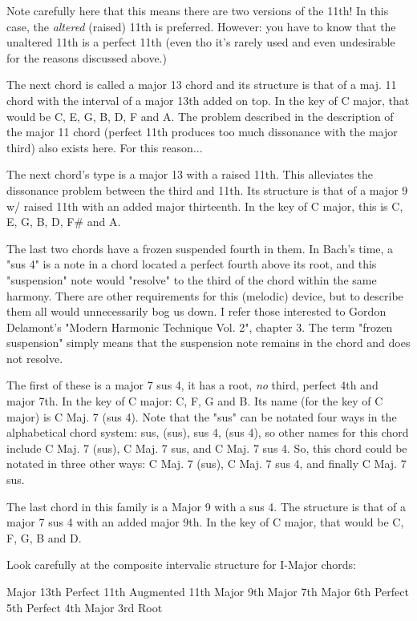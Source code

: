 Note carefully here that this means there are two versions of the 11th! 
In this case, the \emph{altered} (raised) 11th is preferred. However: you have 
to know that the unaltered 11th is a perfect 11th (even tho it's rarely 
used and even undesirable for the reasons discussed above.)

The next chord is called a major 13 chord and its structure is that of a 
maj. 11 chord with the interval of a major 13th added on top. In the key
of C major, that would be C, E, G, B, D, F and A. The problem described 
in the description of the major 11 chord (perfect 11th produces too much 
dissonance with the major third) also exists here. For this reason...

The next chord's type is a major 13 with a raised 11th. This alleviates 
the dissonance problem between the third and 11th. Its structure is that 
of a major 9 w/ raised 11th with an added major thirteenth. In the key of 
C major, this is C, E, G, B, D, F\# and A.

The last two chords have a frozen suspended fourth in them. In Bach's 
time, a "sus 4" is a note in a chord located a perfect fourth above its
root, and this "suspension" note would "resolve" to the third of the 
chord within the same harmony. There are other requirements for this 
(melodic) device, but to describe them all would unnecessarily bog us 
down. I refer those interested to Gordon Delamont's "Modern Harmonic 
Technique Vol. 2", chapter 3. The term "frozen suspension" simply means
that the suspension note remains in the chord and does not resolve.

The first of these is a major 7 sus 4, it has a root, \emph{no} third, perfect 
4th and major 7th. In the key of C major: C, F, G and B. Its name (for the
key of C major) is C Maj. 7 (sus 4). Note that the "sus" can be notated 
four ways in the alphabetical chord system: sus, (sus), sus 4, (sus 4), 
so other names for this chord include C Maj. 7 (sus), C Maj. 7 sus, and 
C Maj. 7 sus 4. So, this chord could be notated in three other ways:
C Maj. 7 (sus), C Maj. 7 sus 4, and finally C Maj. 7 sus. 

The last chord in this family is a Major 9 with a sus 4. The structure 
is that of a major 7 sus 4 with an added major 9th. In the key of C major, 
that would be C, F, G, B and D.

Look carefully at the composite intervalic structure for I-Major chords:

        Major 13th
       Perfect 11th   Augmented 11th
        Major 9th
        Major 7th
        Major 6th
       Perfect 5th
       Perfect 4th
        Major 3rd
          Root

